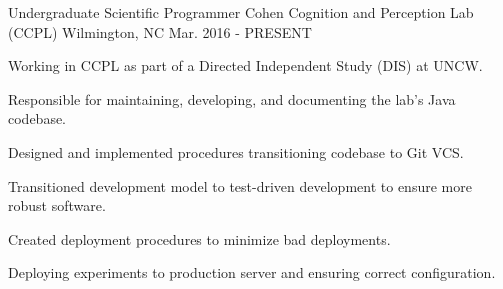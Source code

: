 \begin{cventries}
  \cventry
    {Undergraduate Scientific Programmer} %
    {Cohen Cognition and Perception Lab (CCPL)} %
    {Wilmington, NC} %
    {Mar. 2016 - PRESENT} %
    {
      \begin{cvitems}
        \item {Working in CCPL as part of a Directed Independent Study (DIS) at UNCW.}
        \item {Responsible for maintaining, developing, and documenting the lab's Java codebase.}
        \item {Designed and implemented procedures transitioning codebase to Git VCS.}
        \item {Transitioned development model to test-driven development to ensure more robust software.}
        \item {Created deployment procedures to minimize bad deployments.}
        \item {Deploying experiments to production server and ensuring correct configuration.}
      \end{cvitems}
    }
\end{cventries}

